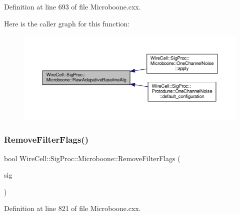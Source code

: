 Definition at line 693 of file Microboone.\+cxx.

Here is the caller graph for this function\+:
\nopagebreak
\begin{figure}[H]
\begin{center}
\leavevmode
\includegraphics[width=350pt]{namespace_wire_cell_1_1_sig_proc_1_1_microboone_a05c4b5687320b38db3ada0478e9b729b_icgraph}
\end{center}
\end{figure}
\mbox{\label{namespace_wire_cell_1_1_sig_proc_1_1_microboone_a772813d4954fff2b2089d97db4bd5875}} 
\subsubsection{\texorpdfstring{Remove\+Filter\+Flags()}{RemoveFilterFlags()}}
{\footnotesize\ttfamily bool Wire\+Cell\+::\+Sig\+Proc\+::\+Microboone\+::\+Remove\+Filter\+Flags (\begin{DoxyParamCaption}\item[{\hyperlink{namespace_wire_cell_1_1_waveform_a479175e541c8545e87cd8063b74b6956}{Wire\+Cell\+::\+Waveform\+::realseq\+\_\+t} \&}]{sig }\end{DoxyParamCaption})}



Definition at line 821 of file Microboone.\+cxx.

